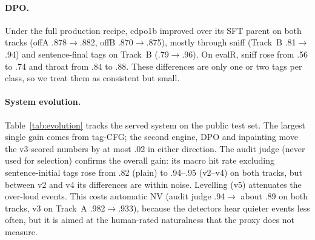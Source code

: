 \documentclass[11pt]{article}
\begin{document}
\begin{table}[t]
\centering\small
{}
\caption{NV splicing on plain SFT outputs (public test). NV = tag-ASR v3 hit rate; in the v3 and
\emph{any} rows v3 also decided which tags to splice.}
\label{tab:splice}
\end{table}

\paragraph{DPO.} Under the full production recipe, cdpo1b improved over its SFT parent on both tracks (offA
.878$\rightarrow$.882, offB .870$\rightarrow$.875), mostly through sniff (Track~B .81$\rightarrow$.94) and
sentence-final tags on Track~B (.79$\rightarrow$.96). On evalR, sniff rose from .56 to .74 and throat from .84 to .88.
These differences are only one or two tags per class, so we treat them as consistent but small.

\paragraph{System evolution.} Table~\ref{tab:evolution} tracks the served system on the public test set. The largest
single gain comes from tag-CFG; the second engine, DPO and inpainting move the v3-scored numbers by at most .02 in
either direction. The audit judge (never used for selection) confirms the overall gain: its macro hit rate excluding
sentence-initial tags rose from .82 (plain) to .94--.95 (v2--v4) on both tracks, but between v2 and v4 its differences
are within noise. Levelling (v5) attenuates the over-loud events. This costs automatic NV (audit judge .94$\rightarrow$
about .89 on both tracks, v3 on Track~A .982$\rightarrow$.933), because the detectors hear quieter events less often,
but it is aimed at the human-rated naturalness that the proxy does not measure.
\end{document}
